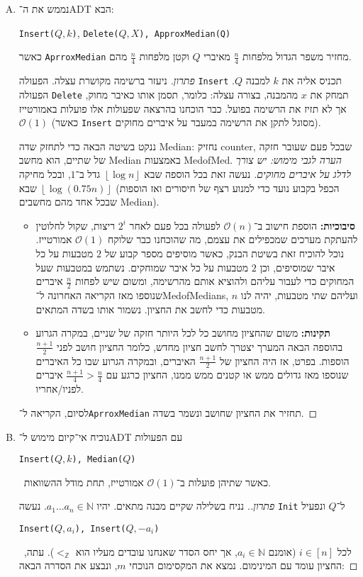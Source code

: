 \documentclass[]{article}
\newcommand\en[1] {\begin{otherlanguage}{english}#1\end{otherlanguage}}
\newcommand\N     {\mathbb{N}}
\newcommand\Z     {\mathbb{Z}}
\newcommand\oc    {\mathcal{O}}
\newcommand\rf    {\right\rfloor}
\newcommand\lf    {\left\lfloor}
\newcommand\floor [1] {\lf #1 \rf}
\newcommand\logn  {\log n}
\theoremstyle{definition}
\begin{document}
	\section{}
	\begin{enumerate}[A.]
		\item נממש את ה־ADT הבא: \en{\texttt{Insert($Q, k$)}, \texttt{Delete($Q, X$), \texttt{ApproxMedian(Q)}}} כאשר \texttt{AprroxMedian} מחזיר משפר הגדול מלפחות $\frac{n}{4}$ מאיברי $Q$ וקטן מלפחות $\frac{n}{4}$ מהם. 
		\begin{proof}[פתרון]
			ניעזר ברשימה מקושרת עצלה. הפעולה \texttt{Insert} תכניס אליה את $k$ למבנה $Q$. הפעולה \texttt{Delete} תמחק את $x$ מהמבנה, בצורה עצלה: כלומר, תסמן אותו כאיבר מחוק, אך לא תזיז את הרשימה בפועל. כבר הוכחנו בהרצאה שפעולות אלו פועלות באמורטייז $\oc(1)$ (כאשר \texttt{Insert} מסוגל לתקן את הרשימה במעבר על איברים מחוקים). 
			
			ננקט בשיטה הבאה כדי לתחזק שדה Median: נחזיק counter, שבכל פעם שעובר חזקה של שתיים, הוא מחשב Median באמצעות MedofMed. \textit{הערה לגבי מימוש: יש צורך לדלג על איברים מחוקים. }נעשה זאת בכל הוספה שבא $\floor{\logn}$ גדל ב־$1$, ובכל מחיקה שבא $\floor{\log(0.75n)}$ (הכפל בקבוע נועד כדי למנוע רצף של חיסורים ואז הוספות שבכל אחד מהם מחשבים Median). 
			\begin{itemize}
				\item \textbf{סיבוכיות: }הוספת חישוב ב־$\oc(n)$ לפעולה בכל פעם לאחר $2^{i}$ ריצות, שקול לחלוטין להעתקת מערכים שמכפילים את עצמם, מה שהוכחנו כבר שלוקח $\oc(1)$ אמורטייז. נוכל להוכיח זאת בשיטת הבנק, כאשר מוסיפים מספר קבוע של $2$ מטבעות על כל איבר שמוסיפים, וכן $2$ מטבעות על כל איבר שמוחקים. נשתמש במטבעות שעל המחוקים כדי לעבור עליהם ולהוציא אותם מהרשימה, ומשום שיש לפחות $\frac{n}{2}$ איברים שנוספו מאז הקריאה האחרונה ל־MedofMedians, ועליהם שתי מטבעות, יהיה לנו $n$ מטבעות כדי לחשב את החציון. נשמור אותו בשדה המתאים. 
				\item \textbf{תקינות: }משום שהחציון מחושב כל לכל היותר חזקה של שניים, במקרה הגרוע בהוספה הבאה המערך יצטרך לחשב חציון מחדש, כלומר החציון חושב לפני $\frac{n + 1}{2}$ הוספות. בפרט, אז היה החציון של $\frac{n + 1}{2}$ האיברים, ובמקרה הגרוע שבו כל האיברים שנוספו מאז גדולים ממש או קטנים ממש ממנו, החציון כרגע עם $\frac{n + 1}{4} > \frac{n}{4}$ איברים לפניו/אחריו. 
			\end{itemize}
			
			לסיום, הקריאה ל־\texttt{AprroxMedian} תחזיר את החציון שחושב ונשמר בשדה. 
		\end{proof}
		
		\item נוכיח אי־קיום מימוש ל־ADT עם הפעולות \en{\texttt{Insert($Q, k$), \texttt{Median($Q$)}}}\, כאשר שתיהן פועלות ב־$\oc(1)$ אמורטייז, תחת מודל ההשוואות. \begin{proof}[פתרון.]
			נניח בשלילה שקיים מבנה מתאים. יהיו $a_1 \dots a_n \in \N$. נעשה \texttt{Init} ל־$Q$ ונפעיל \en{\texttt{Insert($Q, a_i$), Insert($Q, -a_i$)}} \, לכל $i \in [n]$ (אומנם $a_i \in \N$, אך יחס הסדר שאנחנו עובדים מעליו הוא $<_\Z$). עתה, החציון עומד עם המינימום. נמצא את המקסימום הנוכחי $m$, ונבצע את הסדרה הבאה: 
			

\end{proof}
\end{enumerate}
\end{document}
